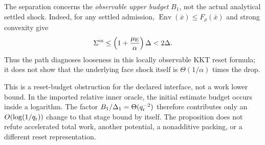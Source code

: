 \begin{proposition}
The separation concerns the \emph{observable upper budget} $B_1$, not the
actual analytical settled shock.  Indeed, for any settled admission,
$\operatorname{Env}(\bar x)\leq F_\rho(\bar x)$ and strong convexity give
\begin{equation}
 \Sigma^{\rm es}
 \leq\left(1+\frac{\mu_{\rm E}}\alpha\right)\Delta<2\Delta.
 \label{eq:settled-actual-shock-drop-bound}
\end{equation}
Thus the path diagnoses looseness in this locally observable KKT reset
formula; it does not show that the underlying face shock itself is
$\Theta(1/\alpha)$ times the drop.

This is a reset-budget obstruction for the declared interface, not a work
lower bound.  In the imported relative inner oracle, the initial estimate
budget occurs inside a logarithm.  The factor
$B_1/\Delta_1=\Theta(q_{\rm r}^{-2})$ therefore contributes only an
$O(\log(1/q_{\rm r}))$ change to that stage bound by itself.  The proposition
does not refute accelerated total work, another potential, a nonadditive
packing, or a different reset representation.
\end{proposition}

